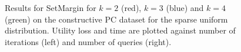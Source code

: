\documentclass{article}
\renewcommand\[{\begin{equation}}
\renewcommand\]{\end{equation}}
\begin{document}
\begin{figure}
{\begin{tabular}{lcccc}
        \\
    \end{tabular}
    }
    \caption{\label{fig:pc} Results for {\sc SetMargin} for $k=2$
      (red), $k=3$ (blue) and $k=4$ (green) on the constructive PC
      dataset for the sparse uniform distribution. Utility loss and
      time are plotted against number of iterations (left)
      and number of queries (right).}
\end{figure}
\end{document}

